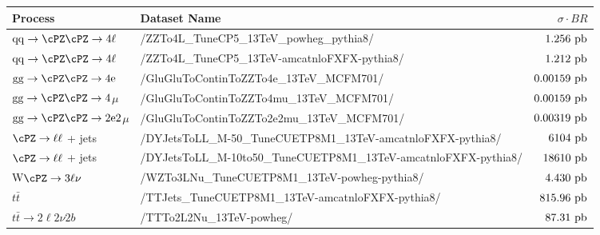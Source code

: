\begin{table}
\begin{footnotesize}
    \centering
    \begin{tabular}{|l|l|r|}
   \hline
 Process & Dataset Name & $\sigma\cdot BR$ \\ \hline
 $\rm{qq} \to \cPZ\cPZ \to 4\ell$ & /ZZTo4L\_TuneCP5\_13TeV\_powheg\_pythia8/ & $1.256~\rm{pb}$ \\
 $\rm{qq} \to \cPZ\cPZ \to 4\ell$ & /ZZTo4L\_TuneCP5\_13TeV-amcatnloFXFX-pythia8/ & $1.212~\rm{pb}$ \\
 $\rm{gg} \rightarrow \cPZ\cPZ \to 4e$ & /GluGluToContinToZZTo4e\_13TeV\_MCFM701/ & $0.00159~\rm{ pb}$ \\
 $\rm{gg} \rightarrow \cPZ\cPZ \to 4$$\mu$ & /GluGluToContinToZZTo4mu\_13TeV\_MCFM701/ & $0.00159~\rm{ pb}$ \\
 $\rm{gg} \rightarrow \cPZ\cPZ \to 2e2$$\mu$ & /GluGluToContinToZZTo2e2mu\_13TeV\_MCFM701/ & $0.00319~\rm{ pb}$ \\
 $\cPZ \to \ell\ell$ + jets & /DYJetsToLL\_M-50\_TuneCUETP8M1\_13TeV-amcatnloFXFX-pythia8/ & $6104~\rm{ pb}$ \\
 $\cPZ \to \ell\ell$ + jets  & /DYJetsToLL\_M-10to50\_TuneCUETP8M1\_13TeV-amcatnloFXFX-pythia8/ & $18610~\rm{ pb}$ \\ \hline
 W$\cPZ \to 3\ell\nu$ & /WZTo3LNu\_TuneCUETP8M1\_13TeV-powheg-pythia8/ & $4.430~\rm{ pb}$ \\ \hline
 $t\bar{t}$ & /TTJets\_TuneCUETP8M1\_13TeV-amcatnloFXFX-pythia8/ & $815.96~\rm{ pb}$ \\ 
 $t\bar{t} \to 2\ell2\nu 2b$ & /TTTo2L2Nu\_13TeV-powheg/ &  $87.31~\rm{pb}$ \\ 

\end{tabular}
\end{footnotesize}
\end{table}
